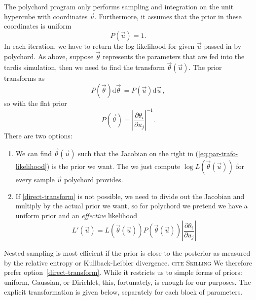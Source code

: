 \documentclass[a4,12pt]{article}
\newcommand{\rmdx}[1]{\mbox{d} #1 \,} %
\newcommand{\vecth}{\ensuremath{{\vec{\theta}}}}
\newcommand{\vecu}{\ensuremath{{\vec{u}}}}
\def \refeq#1{(\ref{eq:#1})}
\newcommand{\todo}[1]{{\textsc{\color{red}#1}}}
\begin{document}
The polychord program only performs sampling and integration on the
unit hypercube with coordinates $\vecu$. Furthermore, it assumes that
the prior in these coordinates is uniform
\begin{equation}
  \label{eq:hypercube-prior}
  P(\vecu) = 1.
\end{equation}
In each iteration, we have to return the log likelihood for given
$\vecu$ passed in by polychord.  As above, suppose $\vecth$ represents
the parameters that are fed into the tardis simulation, then we need
to find the transform $\vecth(\vecu)$. The prior transforms as
\begin{equation}
  \label{eq:par-trafo}
  P(\vecth) \rmdx{\vecth} =  P(\vecu) \rmdx{\vecu},
\end{equation}
so with the flat prior
\begin{equation}
  \label{eq:par-trafo-likelihood}
  P(\vecth) = \left| \frac{\partial \theta_i}{\partial u_j} \right|^{-1} .
\end{equation}
There are two options:
\begin{enumerate}
\item \label{direct-transform} We can find $\vecth(\vecu)$ such that
  the Jacobian on the right in \refeq{par-trafo-likelihood} is the
  prior we want. The we just compute $\log L(\vecth(\vecu))$ for every
  sample $\vecu$ polychord provides.
\item If \ref{direct-transform} is not possible, we need to divide
  out the Jacobian and multiply by the actual prior we want, so for
  polychord we pretend we have a uniform prior and an \emph{effective} likelihood
  \begin{equation}
    \label{eq:eff-likelihood}
    L'(\vecu) = L(\vecth(\vecu)) P(\vecth(\vecu)) \left| \frac{\partial \theta_i}{\partial u_j} \right|
  \end{equation}
\end{enumerate}
Nested sampling is most efficient if the prior is close to the
posterior as measured by the relative entropy or Kullback-Leibler
divergence. \todo{cite Skilling} We therefore prefer
option~\ref{direct-transform}. While it restricts us to simple forms
of priors: uniform, Gaussian, or Dirichlet, this, fortunately, is
enough for our purposes. The explicit transformation is given below,
separately for each block of parameters.

\end{document}
